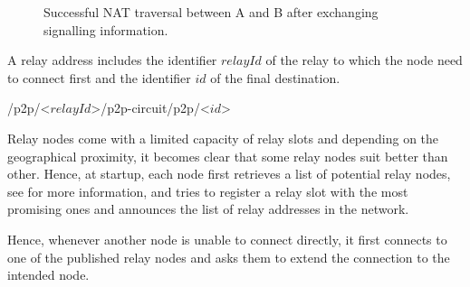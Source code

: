 \begin{figure}[H]
    \label{fig:successful-nat-traversal}
    \caption{Successful NAT traversal between A and B after exchanging signalling information.}
\end{figure}

A relay address includes the identifier $relayId$ of the relay to which the node need to connect first and the identifier $id$ of the final destination.

\begin{center}
    \textsf{/p2p/}\textless\textsf{$relayId$}\textgreater\textsf{/p2p-circuit/p2p/}\textless{}\textsf{$id$}\textgreater{}
\end{center}

Relay nodes come with a limited capacity of relay slots and depending on the geographical proximity, it becomes clear that some relay nodes suit better than other. Hence, at startup, each node first retrieves a list of potential relay nodes, see  for more information, and tries to register a relay slot with the most promising ones and announces the list of relay addresses in the network.

Hence, whenever another node is unable to connect directly, it first connects to one of the published relay nodes and asks them to extend the connection to the intended node.